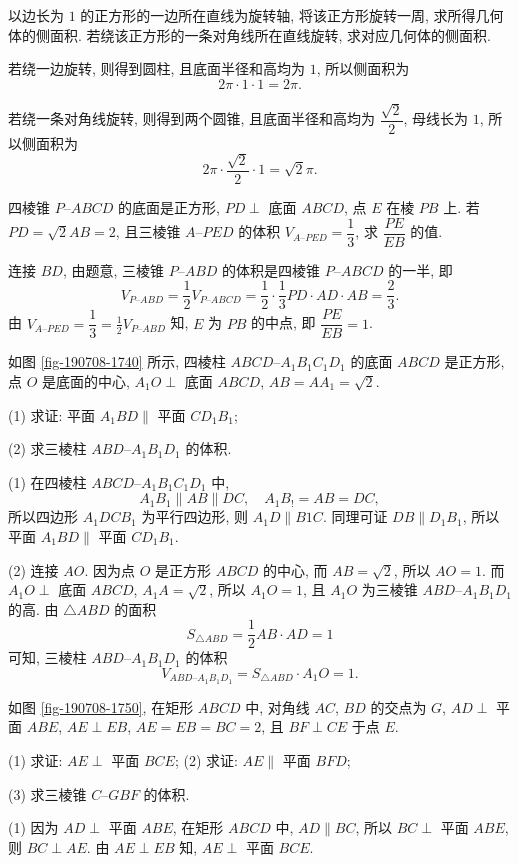 \begin{exercise}
    以边长为 $1$ 的正方形的一边所在直线为旋转轴, 将该正方形旋转一周, 求所得几何体的侧面积. 若绕该正方形的一条对角线所在直线旋转, 求对应几何体的侧面积.
\end{exercise}
\beginsolution
    若绕一边旋转, 则得到圆柱, 且底面半径和高均为 $1$, 所以侧面积为
    \[2\pi\cdot 1\cdot 1= 2\pi.\]

    若绕一条对角线旋转, 则得到两个圆锥, 且底面半径和高均为 $\dfrac{\sqrt2}2$, 母线长为 $1$, 所以侧面积为
    \[2\pi\cdot \frac{\sqrt2}2\cdot 1= \sqrt2\pi.\]
\endsolution

\begin{exercise}
    四棱锥 $P\text{--}ABCD$ 的底面是正方形, $PD\perp$ 底面 $ABCD$, 点 $E$ 在棱 $PB$ 上. 若 $PD=\sqrt2 AB=2$, 且三棱锥 $A\text{--}PED$ 的体积 $V_{A\text{--}PED}=\dfrac13$, 求 $\dfrac{PE}{EB}$ 的值.
\end{exercise}
\beginsolution
    连接 $BD$, 由题意, 三棱锥 $P\text{--}ABD$ 的体积是四棱锥 $P\text{--}ABCD$ 的一半, 即
    \[V_{P\text{--}ABD}= \frac12V_{P\text{--}ABCD}
        = \frac12\cdot \frac13 PD\cdot AD\cdot AB
        = \frac23.\]
    由 $V_{A\text{--}PED}= \dfrac13= \frac12 V_{P\text{--}ABD}$ 知, $E$ 为 $PB$ 的中点, 即 $\dfrac{PE}{EB}=1$.
\endsolution

\begin{exercise}
    如图 \ref{fig-190708-1740} 所示, 四棱柱 $ABCD\text{--}A_1 B_1 C_1 D_1$ 的底面 $ABCD$ 是正方形, 点 $O$ 是底面的中心, $A_1 O\perp$ 底面 $ABCD$, $AB=AA_1 =\sqrt2$.
    
    (1) 求证: 平面 $A_1 BD\parallel$ 平面 $CD_1 B_1$;
    
    (2) 求三棱柱 $ABD\text{--}A_1 B_1 D_1$ 的体积.
\end{exercise}
\beginsolution
    (1) 在四棱柱 $ABCD\text{--}A_1 B_1 C_1 D_1$ 中,
    \[A_1B_1\parallel AB\parallel DC,\quad
        A_1B_!= AB= DC,\]
    所以四边形 $A_1DCB_1$ 为平行四边形, 则 $A_1D\parallel B1C$. 同理可证 $DB\parallel D_1B_1$, 所以平面 $A_1 BD\parallel$ 平面 $CD_1 B_1$.

    (2) 连接 $AO$. 因为点 $O$ 是正方形 $ABCD$ 的中心, 而 $AB=\sqrt2$, 所以 $AO=1$. 而 $A_1O\perp $ 底面 $ABCD$, $A_1A=\sqrt2$, 所以 $A_1O=1$, 且 $A_1O$ 为三棱锥 $ABD\text{--}A_1B_1D_1$ 的高. 由 $\triangle ABD$ 的面积
    \[S_{\triangle ABD}= \frac12 AB\cdot AD= 1\]
    可知, 三棱柱 $ABD\text{--}A_1 B_1 D_1$ 的体积
    \[V_{ABD\text{--}A_1 B_1 D_1}
        = S_{\triangle ABD}\cdot A_1O= 1.\]
\endsolution

\begin{exercise}
    如图 \ref{fig-190708-1750}, 在矩形 $ABCD$ 中, 对角线 $AC$, $BD$ 的交点为 $G$, $AD\perp$ 平面 $ABE$, $AE\perp EB$, $AE=EB=BC=2$, 且 $BF\perp CE$ 于点 $E$.
    
    (1) 求证: $AE\perp$ 平面 $BCE$;\qquad
    (2) 求证: $AE\parallel$ 平面 $BFD$;
    
    (3) 求三棱锥 $C\text{--}GBF$ 的体积.
\end{exercise}
\beginsolution
    (1) 因为 $AD\perp$ 平面 $ABE$, 在矩形 $ABCD$ 中, $AD\parallel BC$, 所以 $BC\perp$ 平面 $ABE$, 则 $BC\perp AE$. 由 $AE\perp EB$ 知, $AE\perp$ 平面 $BCE$.

